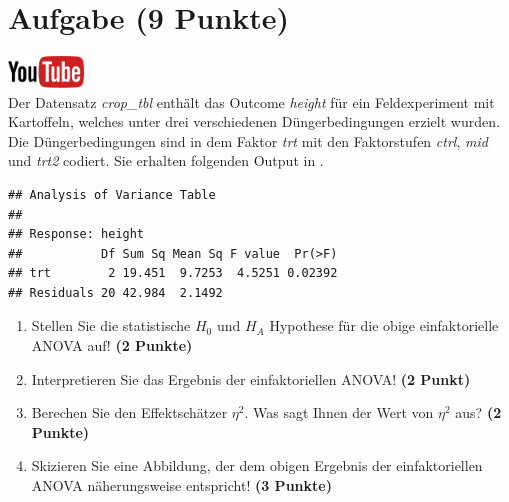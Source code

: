 \documentclass[a4paper, 9pt]{scrartcl}\usepackage[]{graphicx}\usepackage[]{xcolor}
\makeatletter
\newenvironment{kframe}{%
 \def\at@end@of@kframe{}%
 \ifinner\ifhmode%
  \def\at@end@of@kframe{\end{minipage}}%
  \begin{minipage}{\columnwidth}%
 \fi\fi%
 \def\FrameCommand##1{\hskip\@totalleftmargin \hskip-\fboxsep
 \colorbox{shadecolor}{##1}\hskip-\fboxsep
     \hskip-\linewidth \hskip-\@totalleftmargin \hskip\columnwidth}%
 \MakeFramed {\advance\hsize-\width
   \@totalleftmargin\z@ \linewidth\hsize
   \@setminipage}}%
 {\par\unskip\endMakeFramed%
 \at@end@of@kframe}
\newenvironment{knitrout}{}{} %
\makeatother
\begin{document}
 
\clearpage

\section{Aufgabe \hfill (9 Punkte)}

\hfill\href{https://youtu.be/d4CFR2MKX7I}{\includegraphics[width =
  2cm]{img/youtube}}\\[1Ex]




Der Datensatz \textit{crop\_tbl} enth{\"a}lt das Outcome \textit{height} f{\"u}r ein Feldexperiment mit 
Kartoffeln, welches unter drei 
verschiedenen D{\"u}ngerbedingungen erzielt wurden. Die D{\"u}ngerbedingungen sind in dem Faktor
\textit{trt} mit den Faktorstufen \textit{ctrl},  \textit{mid} und
 \textit{trt2} codiert. Sie erhalten folgenden Output in \Rlogo.

\begin{knitrout}
\color{fgcolor}\begin{kframe}
\begin{verbatim}
## Analysis of Variance Table
## 
## Response: height
##           Df Sum Sq Mean Sq F value  Pr(>F)
## trt        2 19.451  9.7253  4.5251 0.02392
## Residuals 20 42.984  2.1492
\end{verbatim}
\end{kframe}
\end{knitrout}

\begin{enumerate}
\item Stellen Sie die statistische $H_0$ und $H_A$ Hypothese f{\"u}r die obige
  einfaktorielle ANOVA auf! \textbf{(2 Punkte)}
\item Interpretieren Sie das Ergebnis der einfaktoriellen ANOVA! \textbf{(2 Punkt)} 
\item Berechen Sie den Effektsch{\"a}tzer $\eta^2$. Was sagt Ihnen der Wert von
  $\eta^2$ aus? \textbf{(2 Punkte)}
\item Skizieren Sie eine Abbildung, der dem obigen Ergebnis der
  einfaktoriellen ANOVA n{\"a}herungsweise entspricht! \textbf{(3 Punkte)}
\end{enumerate}
\end{document}
